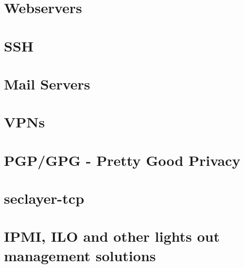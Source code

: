 
\label{section:PracticalSettings}

\section{Webservers}


\section{SSH}


\section{Mail Servers}



\section{VPNs}



\section{PGP/GPG - Pretty Good Privacy}



\section{seclayer-tcp}



\section{IPMI, ILO and other lights out management solutions}





